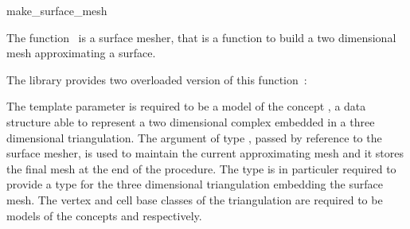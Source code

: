 

\begin{ccRefFunction}{make_surface_mesh}  %



\ccDefinition
  
The function \ccRefName\ is a surface mesher,
that is a function to build a two dimensional mesh 
approximating  a surface.

The library provides two overloaded version 
of this function~:








\ccParameters
The template parameter  
is required to be a model of the concept
,
a data structure able to represent a two dimensional
complex  embedded in a three dimensional triangulation.
The argument  of type ,  passed by reference
to the surface mesher, 
is used to maintain  the current approximating mesh and it stores
the final mesh at the end of the procedure.
The type  is in particuler required to
provide a type 
for the three dimensional triangulation
embedding the surface mesh.
The vertex and cell base classes of the triangulation
 are required
to be  models  of the concepts 
 and 
 respectively.



\end{ccRefFunction}
